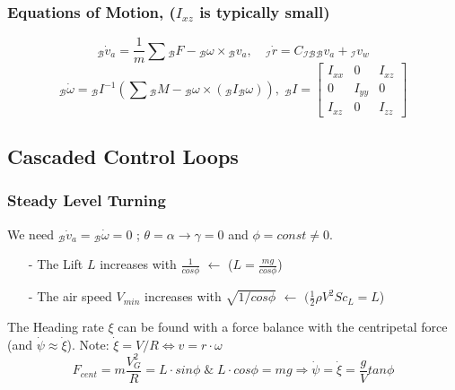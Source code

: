 \documentclass[fontsize=6pt,DIV=calc,a4paper,ngerman]{scrartcl}
\begin{document}
\begin{multicols*}{4}
	\subsubsection{Equations of Motion, ($I_{xz}$ is typically small)}
	$${}_\mathcal{B}\dot{v}_a= \frac{1}{m}\sum{}_\mathcal{B}F - {}_\mathcal{B}\omega \times {}_\mathcal{B}v_a, \quad {}_\mathcal{I}\dot{r}=C_\mathcal{IB} {}_\mathcal{B}v_a+{}_\mathcal{I}v_w$$
	$${}_\mathcal{B}\dot{\omega}={}_\mathcal{B}I^{-1}\left(\sum {}_\mathcal{B}M -{}_\mathcal{B}\omega \times ({}_\mathcal{B}I{}_\mathcal{B}\omega)\right), \; {}_\mathcal{B}I = \left[\begin{smallmatrix}I_{xx} & 0 & I_{xz}\\ 0 & I_{yy} & 0 \\ I_{xz} & 0 & I_{zz}\end{smallmatrix}\right]$$

	\subsection{Cascaded Control Loops}
	\subsubsection{Steady Level Turning}
	We need ${}_\mathcal{B}\dot{v}_a = {}_\mathcal{B}\dot{\omega}=0$ ;  $\theta = \alpha \rightarrow \gamma = 0$ and $\phi = const \neq 0$.

	\begin{itemize}
		\item[-] The Lift $L$ increases with $\frac{1}{cos\phi}$ \quad $\leftarrow$ ($ L = \frac{mg}{cos\phi} $)

		\item[-] The air speed $V_{min}$ increases with $\sqrt{1/cos\phi}$ \quad $\leftarrow$ $(\frac{1}{2}\rho V^2Sc_L = L$)
	\end{itemize}
	The Heading rate $\xi$ can be found with a force balance with the centripetal force (and $\dot{\psi}\approx \dot{\xi}$). Note: $\dot{\xi} = V/R \Leftrightarrow v=r\cdot \omega $
	$$F_{cent}= m\frac{V_{G}^2}{R}= L\cdot sin\phi \; \&\; L\cdot cos\phi = mg \Rightarrow \dot{\psi}= \dot{\xi} = \frac{g}{V}tan\phi$$


\end{multicols*}
\end{document}
